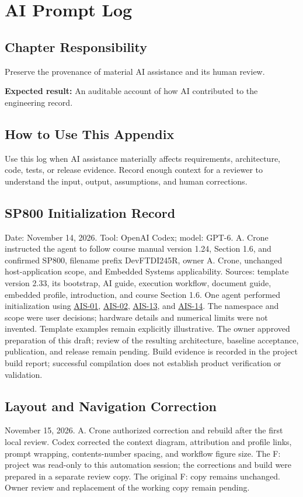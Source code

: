 \chapter{AI Prompt Log}
\section{Chapter Responsibility}
\label{Section:AIPromptLogResponsibility}
Preserve the provenance of material AI assistance and its human review.

\noindent\textbf{Expected result:} An auditable account of how AI contributed to the engineering record.

\section{How to Use This Appendix}
Use this log when AI assistance materially affects requirements, architecture, code, tests, or release evidence. Record enough context for a reviewer to understand the input, output, assumptions, and human corrections.
\section{SP800 Initialization Record}
\label{Section:SP800InitializationLog}
Date: November 14, 2026. Tool: OpenAI Codex; model: GPT-6.
A. Crone instructed the agent to follow course manual version 1.24,
Section 1.6, and confirmed SP800, filename prefix DevFTDI245R, owner
A. Crone, unchanged host-application scope, and Embedded Systems applicability.
Sources: template version 2.33, its bootstrap, AI guide, execution workflow,
document guide, embedded profile, introduction, and course Section 1.6.
One agent performed initialization using
\hyperref[Skill:AIS-01]{AIS-01}, \hyperref[Skill:AIS-02]{AIS-02},
\hyperref[Skill:AIS-13]{AIS-13}, and \hyperref[Skill:AIS-14]{AIS-14}.
The namespace and scope were user decisions; hardware details and numerical
limits were not invented. Template examples remain explicitly illustrative.
The owner approved preparation of this draft; review of the resulting
architecture, baseline acceptance, publication, and release remain pending.
Build evidence is recorded in the project build report; successful compilation
does not establish product verification or validation.

\section{Layout and Navigation Correction}
November 15, 2026. A. Crone authorized correction and rebuild after the first
local review. Codex corrected the context diagram, attribution and profile
links, prompt wrapping, contents-number spacing, and workflow figure size.
The F: project was read-only to this automation session; the corrections and
build were prepared in a separate review copy. The original F: copy remains
unchanged. Owner review and replacement of the working copy remain pending.

